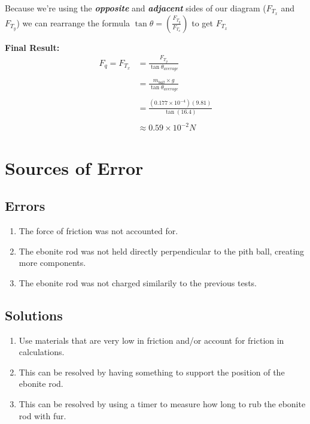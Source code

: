 \documentclass{article}
\begin{document}
\vspace*{0.3cm}
\noindent Because we're using the \textbf{\textit{opposite}} and \textbf{\textit{adjacent}} sides of our diagram
($F_{T_{x}}$ and $F_{T_{y}}$) we can rearrange the formula $\tan\theta = \left(\frac{F_{T_{y}}}{F_{T_{x}}}\right)$
to get $F_{T_{x}}$\newline

\noindent\textbf{Final Result:}
\begin{align*}
    F_{q} = F_{T_{x}} & = \frac{F_{T_{y}}}{\tan\theta_{average}}          \\\\
                      & = \frac{m_{ball} \times g}{\tan\theta_{average}}  \\\\
                      & = \frac{(0.177 \times 10^{-4})(9.81)}{\tan(16.4)} \\\\
                      & \approx 0.59 \times 10^{-2}N
\end{align*}

\section*{Sources of Error}
\subsection*{Errors}
\begin{enumerate}
    \item {The force of friction was not accounted for.}
    \item {The ebonite rod was not held directly perpendicular to the pith ball, creating more components.}
    \item {The ebonite rod was not charged similarily to the previous tests.}
\end{enumerate}
\subsection*{Solutions}
\begin{enumerate}
    \item {Use materials that are very low in friction and/or account for friction in calculations.}
    \item {This can be resolved by having something to support the position of the ebonite rod.}
    \item {This can be resolved by using a timer to measure how long to rub the ebonite rod with fur.}
\end{enumerate}\leavevmode
\end{document}
